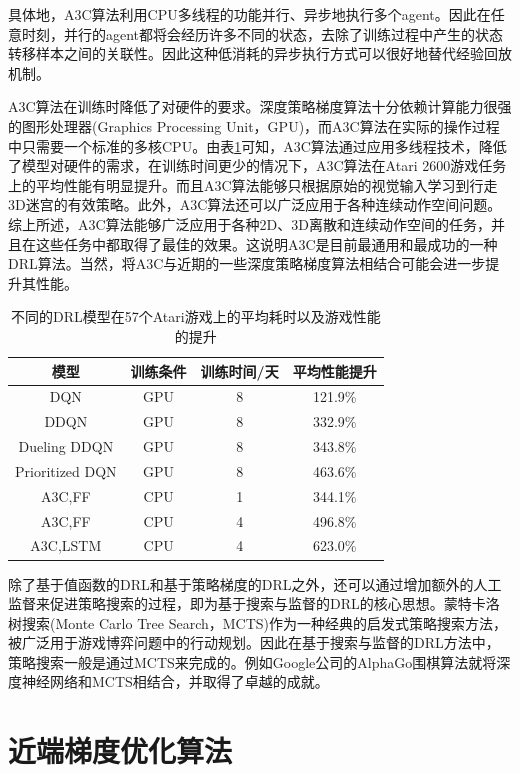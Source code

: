 \documentclass[bachelor]{thesis-uestc}
\begin{document}
	具体地，A3C算法利用CPU多线程的功能并行、异步地执行多个agent。因此在任意时刻，并行的agent都将会经历许多不同的状态，去除了训练过程中产生的状态转移样本之间的关联性。因此这种低消耗的异步执行方式可以很好地替代经验回放机制。
	
	A3C算法在训练时降低了对硬件的要求。深度策略梯度算法十分依赖计算能力很强的图形处理器(Graphics Processing Unit，GPU)，而A3C算法在实际的操作过程中只需要一个标准的多核CPU。由表\ref{tb1}可知，A3C算法通过应用多线程技术，降低了模型对硬件的需求，在训练时间更少的情况下，A3C算法在Atari 2600游戏任务上的平均性能有明显提升。而且A3C算法能够只根据原始的视觉输入学习到行走3D迷宫的有效策略。此外，A3C算法还可以广泛应用于各种连续动作空间问题。综上所述，A3C算法能够广泛应用于各种2D、3D离散和连续动作空间的任务，并且在这些任务中都取得了最佳的效果。这说明A3C是目前最通用和最成功的一种DRL算法。当然，将A3C与近期的一些深度策略梯度算法相结合可能会进一步提升其性能。
	
	\begin{table}[h]
		\caption{不同的DRL模型在57个Atari游戏上的平均耗时以及游戏性能的提升}
		\label{tb1}
		\begin{tabular}{cccc}
			\toprule[1.5pt]
			模型 & 训练条件 & 训练时间/天 & 平均性能提升 \\
			\hline
			DQN & GPU & 8 & 121.9\% \\
			DDQN & GPU & 8 & 332.9\% \\
			Dueling DDQN & GPU & 8 & 343.8\% \\
			Prioritized DQN & GPU & 8 & 463.6\% \\
			A3C,FF & CPU & 1 & 344.1\% \\
			A3C,FF & CPU & 4 & 496.8\% \\
			A3C,LSTM & CPU & 4 & 623.0\% \\
			\bottomrule[1.5pt]
		\end{tabular}
	\end{table}
	除了基于值函数的DRL和基于策略梯度的DRL之外，还可以通过增加额外的人工监督来促进策略搜索的过程，即为基于搜索与监督的DRL的核心思想。蒙特卡洛树搜索(Monte Carlo Tree Search，MCTS)作为一种经典的启发式策略搜索方法，被广泛用于游戏博弈问题中的行动规划。因此在基于搜索与监督的DRL方法中，策略搜索一般是通过MCTS来完成的。例如Google公司的AlphaGo围棋算法就将深度神经网络和MCTS相结合，并取得了卓越的成就。
	
	\section{近端梯度优化算法}\label{ppo}
\end{document}
